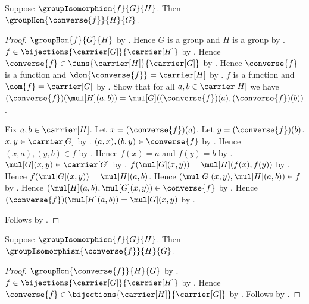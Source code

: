 \begin{theorem}\label{group_isomorphism_converse_hom}
    Suppose $\groupIsomorphism{f}{G}{H}$.
    Then $\groupHom{\converse{f}}{H}{G}$.
\end{theorem}
\begin{proof}
    $\groupHom{f}{G}{H}$ by
        .
    Hence $G$ is a group and $H$ is a group by
        .
    $f\in\bijections{\carrier[G]}{\carrier[H]}$ by
        .
    Hence $\converse{f}\in
        \funs{\carrier[H]}{\carrier[G]}$ by
        .
    Hence $\converse{f}$ is a function and
        $\dom{\converse{f}}=\carrier[H]$ by
        .
    $f$ is a function and $\dom{f}=\carrier[G]$ by
        .
    Show that for all $a,b\in\carrier[H]$ we have
        $(\converse{f})(\mul[H](a,b))=
            \mul[G]((\converse{f})(a),(\converse{f})(b))$.
    \begin{subproof}
        Fix $a,b\in\carrier[H]$.
        Let $x=(\converse{f})(a)$.
        Let $y=(\converse{f})(b)$.
        $x,y\in\carrier[G]$ by
            .
        $(a,x),(b,y)\in\converse{f}$ by
            .
        Hence $(x,a),(y,b)\in f$ by .
        Hence $f(x)=a$ and $f(y)=b$ by
            .
        $\mul[G](x,y)\in\carrier[G]$ by
            .
        $f(\mul[G](x,y))=\mul[H](f(x),f(y))$ by
            .
        Hence $f(\mul[G](x,y))=\mul[H](a,b)$.
        Hence $(\mul[G](x,y),\mul[H](a,b))\in f$ by
            .
        Hence $(\mul[H](a,b),\mul[G](x,y))\in\converse{f}$ by
            .
        Hence
            $(\converse{f})(\mul[H](a,b))=\mul[G](x,y)$ by
            .
    \end{subproof}
    Follows by .
\end{proof}

\begin{theorem}\label{group_isomorphism_converse}
    Suppose $\groupIsomorphism{f}{G}{H}$.
    Then $\groupIsomorphism{\converse{f}}{H}{G}$.
\end{theorem}
\begin{proof}
    $\groupHom{\converse{f}}{H}{G}$ by
        .
    $f\in\bijections{\carrier[G]}{\carrier[H]}$ by
        .
    Hence $\converse{f}\in
        \bijections{\carrier[H]}{\carrier[G]}$ by
        .
    Follows by .
\end{proof}

